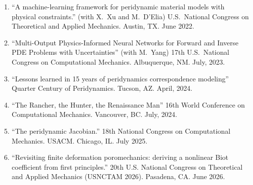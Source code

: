 \begin{enumerate}[resume]
    \item ``A machine-learning framework for peridynamic material models with physical constraints.'' (with X.\ Xu and M.\ D'Elia) U.S.\ National Congress on Theoretical and Applied Mechanics. Austin, TX.  June 2022.
    \item ``Multi-Output Physics-Informed Neural Networks for Forward and Inverse PDE Problems with Uncertainties'' (with M.\ Yang) 17th U.S.\ National Congress on Computational Mechanics. Albuquerque, NM.  July, 2023.
    \item ``Lessons learned in 15 years of peridynamics correspondence modeling''  Quarter Century of Peridynamics. Tucson, AZ.  April, 2024.
    \item ``The Rancher, the Hunter, the Renaissance Man''  16th World Conference on Computational Mechanics. Vancouver, BC.  July, 2024.
    \item ``The peridynamic Jacobian.'' 18th National Congress on Computational Mechanics. USACM. Chicago, IL. July 2025.
    \item ``Revisiting finite deformation poromechanics: deriving a nonlinear Biot coefficient from first principles.'' 20th U.S. National Congress on Theoretical and Applied Mechanics (USNCTAM 2026). Pasadena, CA. June 2026.
\end{enumerate}
\else
\ifdefined\ispdf
